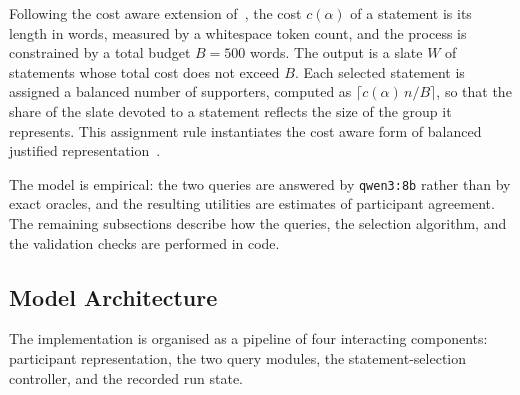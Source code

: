 \documentclass[letterpaper,11pt]{article}
\theoremstyle{plain}
\theoremstyle{definition}
\begin{document}
Following the cost aware extension of~\citet{boehmer2025nextgen}, the cost $c(\alpha)$ of a statement is its length in words, measured by a whitespace token count, and the process is constrained by a total budget $B=500$ words. The output is a slate $W$ of statements whose total cost does not exceed $B$. Each selected statement is assigned a balanced number of supporters, computed as $\lceil c(\alpha)\,n/B\rceil$, so that the share of the slate devoted to a statement reflects the size of the group it represents. This assignment rule instantiates the cost aware form of balanced justified representation~\citep{boehmer2025nextgen,aziz2017jr}.

The model is empirical: the two queries are answered by \texttt{qwen3:8b} rather than by exact oracles, and the resulting utilities are estimates of participant agreement. The remaining subsections describe how the queries, the selection algorithm, and the validation checks are performed in code.

\subsection{Model Architecture}

The implementation is organised as a pipeline of four interacting components: participant representation, the two query modules, the statement-selection controller, and the recorded run state.
\end{document}
